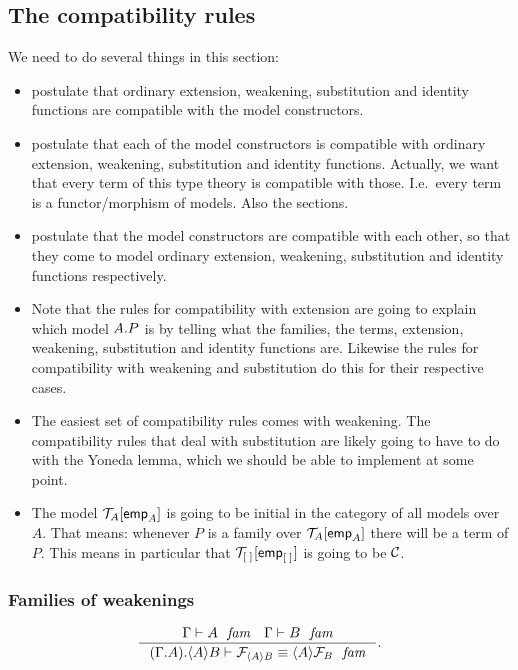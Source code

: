 \subsection{The compatibility rules}
We need to do several things in this section:
\begin{itemize}
\item postulate that ordinary extension, weakening, substitution and identity
functions are compatible with the model constructors.
\item postulate that each of the model constructors is compatible with ordinary
extension, weakening, substitution and identity functions. Actually, we want
that every term of this type theory is compatible with those. I.e.~every term
is a functor/morphism of models. Also the sections.
\item postulate that the model constructors are compatible with each other,
so that they come to model ordinary extension, weakening, substitution and
identity functions respectively.
\item Note that the rules for compatibility with extension are going to explain which
model $\ctxext{A}{P}$ is by telling what the families, the terms, extension,
weakening, substitution and identity functions are. Likewise the rules for
compatibility with weakening and substitution do this for their respective
cases.
\item The easiest set of compatibility rules comes with weakening. The compatibility
rules that deal with substitution are likely going to have to do with the
Yoneda lemma, which we should be able to implement at some point.
\item The model $\subst{\tfemp{A}}{\mtm{A}}$ is going to be initial in the category of
all models over $A$. That means: whenever $P$ is a family over $\subst{\tfemp{A}}
{\mtm{A}}$ there will be a term of $P$. This means in particular that
$\subst{\tfemp{\emptyf}}{\mtm{\emptyf}}$ is going to be $\mathcal{C}$.
\end{itemize}

\subsubsection{Families of weakenings}
\begin{equation*}
\inference
  { \jfam{\Gamma}{A}
    \jfam{\Gamma}{B}
    }
  { \jfameq
      {{{\Gamma}{A}}{\ctxwk{A}{B}}}
      {\mfam{\ctxwk{A}{B}}}
      {\ctxwk{A}{\mfam{B}}}
    }.
\end{equation*}

